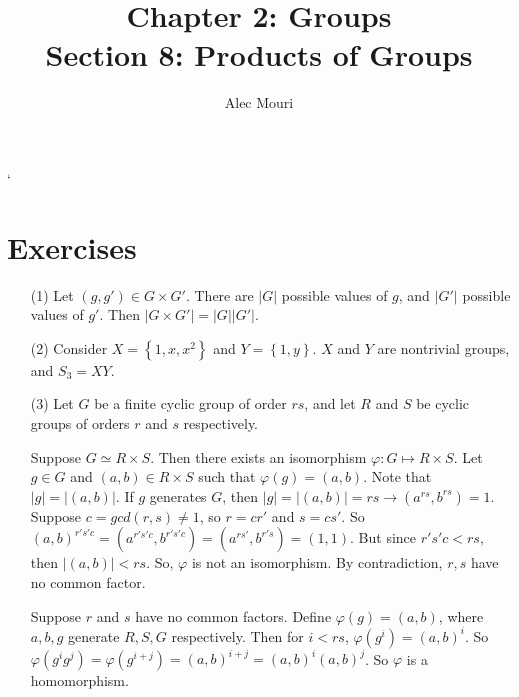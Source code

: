 \documentclass[12pt]{article}
\begin{document}
\title{Chapter 2: Groups \\ Section 8: Products of Groups}
\author{Alec Mouri}

\maketitle`
\section*{Exercises}
\begin{itemize}
\item[(1)]
Let $(g, g') \in G \times G'$. There are $|G|$ possible values of $g$, and $|G'|$ possible values of $g'$. Then $|G \times G'| = |G||G'|$.
\item[(2)]
Consider $X = \left\lbrace 1, x, x^2 \right\rbrace$ and $Y = \left\lbrace 1, y \right\rbrace$. $X$ and $Y$ are nontrivial groups, and $S_3 = XY$.
\item[(3)]
Let $G$ be a finite cyclic group of order $rs$, and let $R$ and $S$ be cyclic groups of orders $r$ and $s$ respectively.

Suppose $G \simeq R \times S$. Then there exists an isomorphism $\varphi: G \mapsto R \times S$. Let $g \in G$ and $(a, b) \in R \times S$ such that $\varphi(g) = (a, b)$. Note that $|g| = |(a, b)|$. If $g$ generates $G$, then $|g| = |(a, b)| = rs \rightarrow (a^{rs}, b^{rs}) = 1$. Suppose $c = gcd(r, s) \neq 1$, so $r = cr'$ and $s = cs'$. So $(a, b)^{r's'c} = (a^{r's'c}, b^{r's'c}) = (a^{rs'}, b^{r's}) = (1, 1)$. But since $r's'c < rs$, then $|(a, b)| < rs$. So, $\varphi$ is not an isomorphism. By contradiction, $r, s$ have no common factor.

Suppose $r$ and $s$ have no common factors. Define $\varphi(g) = (a, b)$, where $a, b, g$ generate $R, S, G$ respectively. Then for $i < rs$, $\varphi(g^i) = (a, b)^i$. So $\varphi(g^ig^j) = \varphi(g^{i+j}) = (a, b)^{i + j} = (a, b)^i(a, b)^j$. So $\varphi$ is a homomorphism.


\end{itemize}
\end{document}
